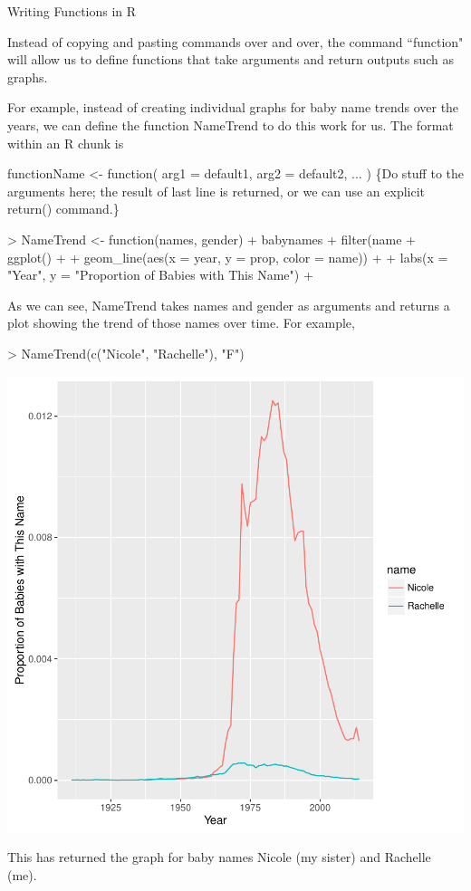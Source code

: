 \documentclass[12pt]{book}
\begin{document}



\begin{center}
\Large{Writing Functions in R}
\end{center}


\noindent Instead of copying and pasting commands over and over, the command ``function" will allow us to define functions that take arguments and return outputs such as graphs.


\noindent For example, instead of creating individual graphs for baby name trends over the years, we can define the function NameTrend to do this work for us. The format within an R chunk is 


\hfill\begin{minipage}{\dimexpr\textwidth-3cm}
 functionName <- function( arg1 = default1, arg2 = default2, ... ) \{Do stuff to the arguments here; the result of last line is returned, or we can use an explicit return() command.\}
\end{minipage}


\begin{Schunk}
\begin{Sinput}
> NameTrend <- function(names, gender) {
+   babynames %
+   filter(name %
+   ggplot() +
+   geom_line(aes(x = year, y = prop, color = name)) +
+     labs(x = "Year", y = "Proportion of Babies with This Name")
+ }
\end{Sinput}
\end{Schunk}


\noindent As we can see, NameTrend takes names and gender as arguments and returns a plot showing the trend of those names over time. For example,

\begin{Schunk}
\begin{Sinput}
> NameTrend(c("Nicole", "Rachelle"), "F")
\end{Sinput}
\end{Schunk}
\includegraphics{PracticeSweave-003}


This has returned the graph for baby names Nicole (my sister) and Rachelle (me).
\end{document}
